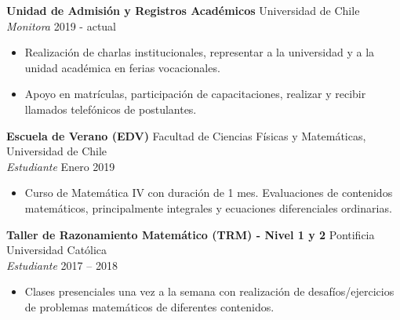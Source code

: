 \documentclass[a4paper, 10pt]{extarticle}
\begin{document}
\noindent
\textbf{Unidad de Admisión y Registros Académicos} \hfill Universidad de Chile\\
\textit{Monitora} \hfill 2019 - actual 
\begin{itemize}
    \item Realización de charlas institucionales, representar a la universidad y a la unidad académica en ferias vocacionales.
    \item Apoyo en matrículas, participación de capacitaciones, realizar y recibir llamados telefónicos de postulantes.
\end{itemize}

\noindent
\textbf{Escuela de Verano (EDV)} \hfill Facultad de Ciencias Físicas y Matemáticas, Universidad de Chile\\ 
\textit{Estudiante} \hfill Enero 2019 
\begin{itemize}
    \item Curso de Matemática IV con duración de 1 mes. Evaluaciones de contenidos matemáticos, principalmente integrales y ecuaciones diferenciales ordinarias.
\end{itemize}

\textbf{Taller de Razonamiento Matemático (TRM) - Nivel 1 y 2} \hfill Pontificia Universidad Católica\\
\textit{Estudiante} \hfill 2017 – 2018 
\begin{itemize}
    \item Clases presenciales una vez a la semana con realización de desafíos/ejercicios de problemas matemáticos de diferentes contenidos. 
\end{itemize}

\end{document}
